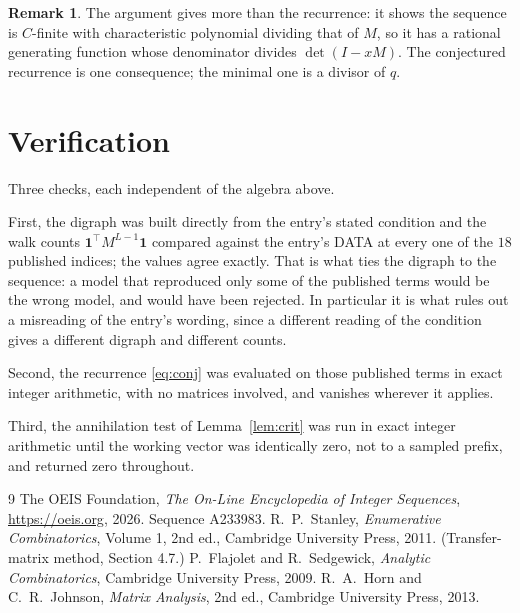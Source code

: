 \documentclass[11pt,a4paper]{article}
\theoremstyle{plain}
\theoremstyle{definition}
\newtheorem{remark}[theorem]{Remark}
\begin{document}
\begin{remark}
The argument gives more than the recurrence: it shows the sequence is $C$-finite with
characteristic polynomial dividing that of $M$, so it has a rational generating function
whose denominator divides $\det(I-xM)$. The conjectured recurrence is one consequence; the
minimal one is a divisor of $q$.
\end{remark}

\section{Verification}

Three checks, each independent of the algebra above.

First, the digraph was built directly from the entry's stated condition and the walk counts
$\mathbf{1}^{\!\top}M^{L-1}\mathbf{1}$ compared against the entry's DATA at
every one of the $18$ published indices; the values agree exactly. That is what ties
the digraph to the sequence: a model that reproduced only some of the published terms would
be the wrong model, and would have been rejected. In particular it is what rules out a
misreading of the entry's wording, since a different reading of the condition gives a
different digraph and different counts.

Second, the recurrence \eqref{eq:conj} was evaluated on those published terms in exact
integer arithmetic, with no matrices involved, and vanishes wherever it applies.

Third, the annihilation test of Lemma~\ref{lem:crit} was run in exact integer arithmetic
until the working vector was identically zero, not to a sampled prefix, and returned zero
throughout.

\begin{thebibliography}{9}
 The OEIS Foundation, \emph{The On-Line Encyclopedia of Integer
Sequences}, \url{https://oeis.org}, 2026. Sequence A233983.
 R.~P.~Stanley, \emph{Enumerative Combinatorics}, Volume 1, 2nd ed.,
Cambridge University Press, 2011. (Transfer-matrix method, Section 4.7.)
 P.~Flajolet and R.~Sedgewick, \emph{Analytic Combinatorics}, Cambridge
University Press, 2009.
 R.~A.~Horn and C.~R.~Johnson, \emph{Matrix Analysis}, 2nd ed., Cambridge
University Press, 2013.
\end{thebibliography}
\end{document}
